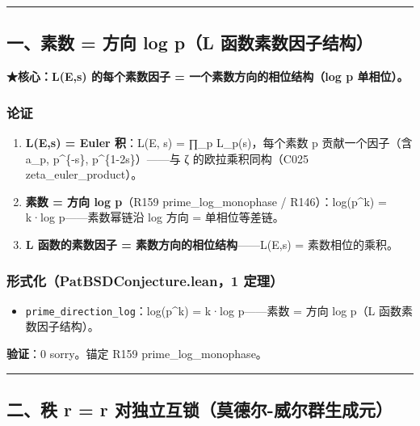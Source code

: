 \documentclass[
]{article}
\providecommand{\tightlist}{%
  \setlength{\itemsep}{0pt}\setlength{\parskip}{0pt}}
\begin{document}
\begin{center}\rule{0.5\linewidth}{0.5pt}\end{center}

\subsection{一、素数 = 方向 log p（L
函数素数因子结构）}\label{ux4e00ux7d20ux6570-ux65b9ux5411-log-pl-ux51fdux6570ux7d20ux6570ux56e0ux5b50ux7ed3ux6784}

\textbf{★核心：L(E,s) 的每个素数因子 = 一个素数方向的相位结构（log p
单相位）。}

\subsubsection{论证}\label{ux8bbaux8bc1}

\begin{enumerate}
\def\labelenumi{\arabic{enumi}.}
\tightlist
\item
  \textbf{L(E,s) = Euler 积}：L(E, s) = ∏\_p L\_p(s)，每个素数 p
  贡献一个因子（含 a\_p, p\^{}\{-s\}, p\^{}\{1-2s\}）------与 ζ
  的欧拉乘积同构（C025 zeta\_euler\_product）。
\item
  \textbf{素数 = 方向 log p}（R159 prime\_log\_monophase /
  R146）：log(p\^{}k) = k·log p------素数幂链沿 log 方向 =
  单相位等差链。
\item
  \textbf{L 函数的素数因子 = 素数方向的相位结构}------L(E,s) =
  素数相位的乘积。
\end{enumerate}

\subsubsection{形式化（PatBSDConjecture.lean，1
定理）}\label{ux5f62ux5f0fux5316patbsdconjecture.lean1-ux5b9aux7406}

\begin{itemize}
\tightlist
\item
  \texttt{prime\_direction\_log}：log(p\^{}k) = k·log p------素数 = 方向
  log p（L 函数素数因子结构）。
\end{itemize}

\textbf{验证}：0 sorry。锚定 R159 prime\_log\_monophase。

\begin{center}\rule{0.5\linewidth}{0.5pt}\end{center}

\subsection{二、秩 r = r
对独立互锁（莫德尔-威尔群生成元）}\label{ux4e8cux79e9-r-r-ux5bf9ux72ecux7acbux4e92ux9501ux83abux5fb7ux5c14-ux5a01ux5c14ux7fa4ux751fux6210ux5143}
\end{document}
